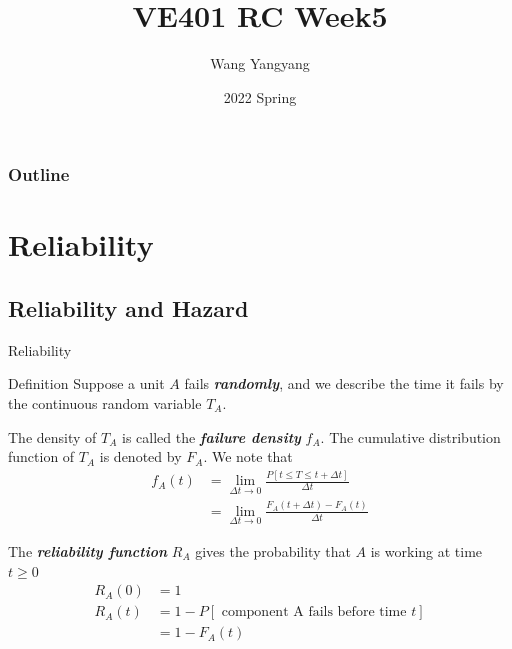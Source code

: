 \documentclass{beamer}
\title{VE401 RC Week5}
\author{Wang Yangyang}
\date{2022 Spring}
\institute{UM-SJTU JI}
\newcommand{\bb}[1]{\textcolor{antiquefuchsia}{\textbf{\textit{#1}}}}
\begin{document}
\maketitle

\begin{frame}
\frametitle{Outline}
\tableofcontents
\end{frame}



\section{Reliability}
\subsection{Reliability and Hazard}
\begin{frame}{Reliability}
\begin{block}{Definition}
Suppose a unit $A$ fails \bb{randomly}, and we describe the time it fails by the continuous random variable $T_{A}$.

The density of $T_{A}$ is called the \bb{failure density} $f_{A}$.
The cumulative distribution function of $T_{A}$ is denoted by $F_{A}$.
We note that
$$
\begin{aligned}
f_{A}(t) &=\lim _{\Delta t \rightarrow 0} \frac{P[t \leq T \leq t+\Delta t]}{\Delta t} \\
&=\lim _{\Delta t \rightarrow 0} \frac{F_{A}(t+\Delta t)-F_{A}(t)}{\Delta t}
\end{aligned}
$$

The \bb{reliability function} $R_{A}$ gives the probability that $A$ is working at time $t \geq 0$
$$
\begin{aligned}
R_{A}(0) &=1 \\
R_{A}(t) &=1-P[\text { component A fails before time } t] \\
&=1-F_{A}(t)
\end{aligned}
$$
\end{block}
\end{frame}
\end{document}
